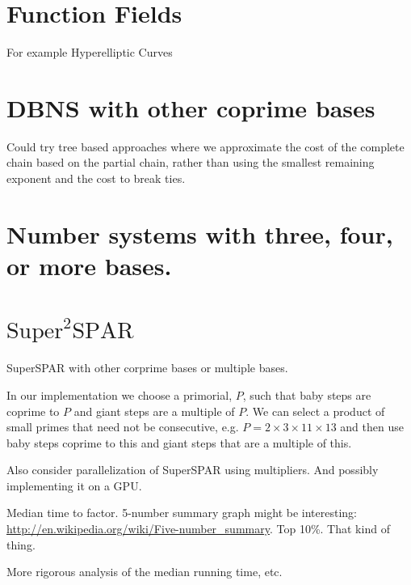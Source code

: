 \documentclass{ucalgthes1}
\theoremstyle{definition}
\begin{document}
\section{Function Fields}

For example Hyperelliptic Curves

\section{DBNS with other coprime bases}

Could try tree based approaches where we approximate the cost of the complete chain based on the partial chain, rather than using the smallest remaining exponent and the cost to break ties.

\section{Number systems with three, four, or more bases.}

\section{$\textrm{Super}^2\textrm{SPAR}$}

SuperSPAR with other corprime bases or multiple bases.

In our implementation we choose a primorial, $P$, such that baby steps are coprime to $P$ and giant steps are a multiple of $P$.  We can select a product of small primes that need not be consecutive, e.g. $P = 2 \times 3 \times 11 \times 13$ and then use baby steps coprime to this and giant steps that are a multiple of this.

Also consider parallelization of SuperSPAR using multipliers.  And possibly implementing it on a GPU.

Median time to factor. 5-number summary graph might be interesting: \url{http://en.wikipedia.org/wiki/Five-number_summary}. Top 10\%.  That kind of thing.

More rigorous analysis of the median running time, etc.



\end{document}
